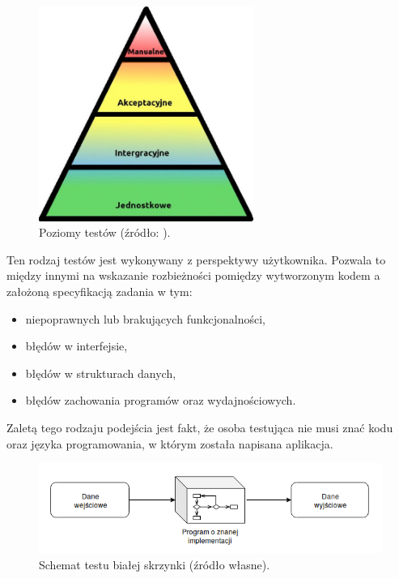 \begin{figure}[h]
    \centering
    \includegraphics[width = 7cm]{chapter02/tests_levels.jpg}
    \caption{Poziomy testów (źródło: \cite{tests-levels}).}
    \label{fig:tests-levels}
\end{figure}

Ten rodzaj testów jest wykonywany z perspektywy użytkownika.
Pozwala to między innymi na wskazanie rozbieżności pomiędzy wytworzonym kodem a założoną specyfikacją zadania w tym:
\begin {itemize}
    \item niepoprawnych lub brakujących funkcjonalności,
    \item błędów w interfejsie,
    \item błędów w strukturach danych,
    \item błędów zachowania programów oraz wydajnościowych.
\end{itemize}
Zaletą tego rodzaju podejścia jest fakt, że osoba testująca nie musi znać kodu oraz języka programowania, w którym została napisana aplikacja.

\begin{figure}[h]
    \centering
    \includegraphics[width = 13cm]{chapter02/white-box.png}
    \caption{Schemat testu białej skrzynki (źródło własne).}
    \label{fig:white-box}
\end{figure}

